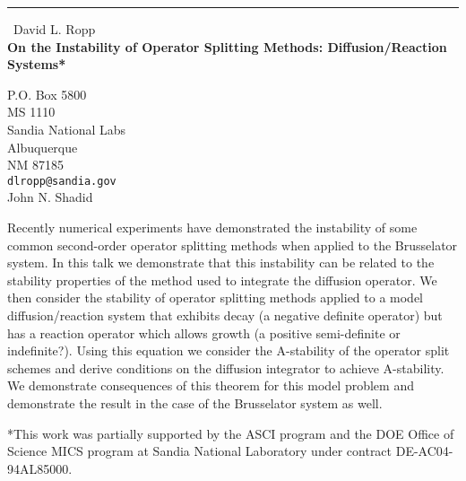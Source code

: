 \documentclass{report}
\begin{document}
\begin{center}
\rule{6in}{1pt} \
{\large David L. Ropp \\
{\bf On the Instability of Operator Splitting Methods: Diffusion/Reaction Systems*}}

P.O. Box 5800 \\ MS 1110 \\ Sandia National Labs \\ Albuquerque \\ NM 87185
\\
{\tt dlropp@sandia.gov}\\
John N. Shadid\end{center}

Recently numerical experiments have demonstrated the instability of some common
second-order operator splitting methods when applied to the Brusselator system.
In this talk we demonstrate that this instability can be related to the
stability properties of the method used to integrate the diffusion operator. We
then consider the stability of operator splitting methods applied to a
model diffusion/reaction system that exhibits decay (a negative definite
operator) but has a
reaction operator which allows growth (a positive semi-definite or indefinite?).
Using this equation we consider the A-stability of the
operator split schemes and derive conditions on the
diffusion integrator to achieve A-stability. We demonstrate consequences of this theorem
for this model problem and demonstrate the result in the case of the Brusselator
system as well.


*This work was partially supported by the ASCI program and the DOE Office
of Science MICS program at Sandia National Laboratory under contract
DE-AC04-94AL85000.
\end{document}
